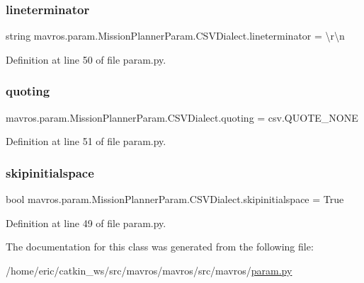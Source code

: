 \subsubsection{\texorpdfstring{lineterminator}{lineterminator}}
{\footnotesize\ttfamily string mavros.\+param.\+Mission\+Planner\+Param.\+C\+S\+V\+Dialect.\+lineterminator = \textquotesingle{}\textbackslash{}r\textbackslash{}n\textquotesingle{}\hspace{0.3cm}{\ttfamily [static]}}



Definition at line 50 of file param.\+py.

\mbox{\label{classmavros_1_1param_1_1MissionPlannerParam_1_1CSVDialect_ad5ad8ae06bb19886b01ec52c3c5540e4}} 
\subsubsection{\texorpdfstring{quoting}{quoting}}
{\footnotesize\ttfamily mavros.\+param.\+Mission\+Planner\+Param.\+C\+S\+V\+Dialect.\+quoting = csv.\+Q\+U\+O\+T\+E\+\_\+\+N\+O\+NE\hspace{0.3cm}{\ttfamily [static]}}



Definition at line 51 of file param.\+py.

\mbox{\label{classmavros_1_1param_1_1MissionPlannerParam_1_1CSVDialect_a4bc6aa9683f05db9886a5761ddf89878}} 
\subsubsection{\texorpdfstring{skipinitialspace}{skipinitialspace}}
{\footnotesize\ttfamily bool mavros.\+param.\+Mission\+Planner\+Param.\+C\+S\+V\+Dialect.\+skipinitialspace = True\hspace{0.3cm}{\ttfamily [static]}}



Definition at line 49 of file param.\+py.



The documentation for this class was generated from the following file\+:\begin{DoxyCompactItemize}
\item 
/home/eric/catkin\+\_\+ws/src/mavros/mavros/src/mavros/\mbox{\hyperlink{param_8py}{param.\+py}}\end{DoxyCompactItemize}
